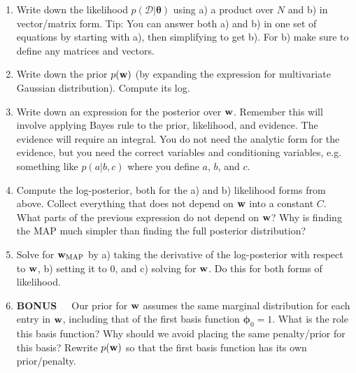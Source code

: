 \documentclass[12pt,a4paper]{article}
\newcommand{\Data}{\mathcal{D}}
\newcommand{\wscalar}{w}
\newcommand{\wvec}{{\bf \wscalar}}
\newcommand{\wvecMAP}{\wvec_{\text{MAP}}}
\newcommand{\thetavec}{\boldsymbol{\theta}}
\newcommand{\thetav}{\thetavec}
\newcommand{\phivec}{\boldsymbol{\phi}}
\begin{document}
\begin{enumerate}
  \item Write down the likelihood $p(\Data | \thetav)$ using a) a product over $N$ and b) in vector/matrix form.    Tip: You can answer both a) and b) in one set of equations by starting with a), then simplifying to get b).  For b) make sure to define any matrices and vectors.
  \item Write down the prior $p(\wvec)$ (by expanding the expression for multivariate Gaussian distribution).  Compute its log.
  \item Write down an expression for the posterior over $\wvec$.  Remember this will involve applying Bayes rule to the prior, likelihood, and evidence.  The evidence will require an integral.  You do not need the analytic form for the evidence, but you need the correct variables and conditioning variables, e.g. something like $p(a|b,c)$ where you define $a$, $b$, and $c$.
  \item Compute the log-posterior, both for the a) and b) likelihood forms from above.  Collect everything that does not depend on $\wvec$ into a constant $C$.  What parts of the previous expression do not depend on $\wvec$?  Why is finding the MAP much simpler than finding the full posterior distribution? 
  \item Solve for $\wvecMAP$ by a) taking the derivative of the log-posterior with respect to $\wvec$, b) setting it to 0, and c) solving for $\wvec$.  Do this for both forms of likelihood.
  \item {\bf BONUS}~~~Our prior for $\wvec$ assumes the same marginal distribution for each entry in $\wvec$, including that of the first basis function $\phivec_0 = 1$.  What is the role this basis function?  Why should we avoid placing the same penalty/prior for this basis?  Rewrite $p(\wvec)$ so that the first basis function has its own prior/penalty.
\end{enumerate}

\vspace{0.25in}
\end{document}
